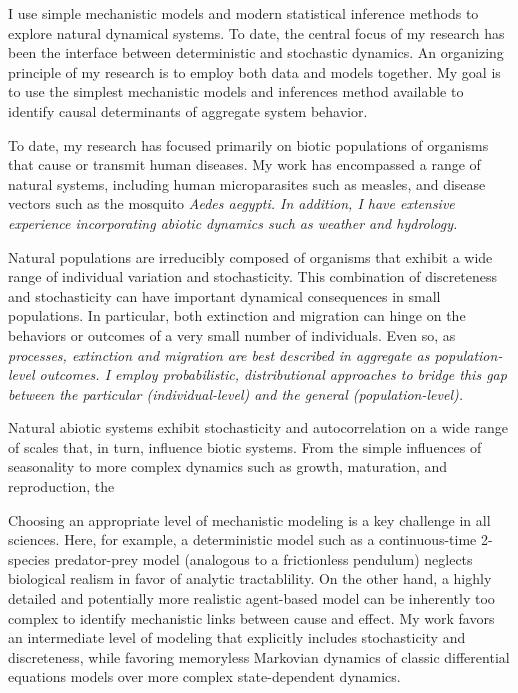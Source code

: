 \documentclass[12pt]{article}
\author{Christian Gunning}
\title{}
\date{\today}
\begin{document}
I use simple mechanistic models and modern statistical inference 
methods to explore natural dynamical systems.
To date, the central focus of my research has been the interface 
between deterministic and stochastic dynamics. 
An organizing principle of my research is to employ both data and models 
together.  
My goal is to use the simplest mechanistic models and inferences 
method available to identify causal determinants of aggregate 
system behavior.

To date, my research has focused primarily on biotic populations
of organisms that cause or transmit human diseases.  My work has 
encompassed a range of natural systems, 
including human microparasites such as measles,
and disease vectors such as the mosquito 
\em{Aedes aegypti}.  In addition, I have extensive 
experience incorporating abiotic dynamics such as weather
and hydrology.

Natural populations are irreducibly composed of 
organisms that exhibit a wide range of individual variation 
and stochasticity.  This combination of discreteness and 
stochasticity can have important dynamical consequences in
small populations. In particular, both extinction and migration
can hinge on the behaviors or outcomes of a very small
number of individuals.
Even so, as \em{processes}, extinction and migration are best
described in aggregate as population-level outcomes. I employ 
probabilistic, distributional approaches to bridge this
gap between the particular (individual-level) and 
the general (population-level).

Natural abiotic systems exhibit stochasticity and 
autocorrelation on a wide range of scales that, in turn,
influence biotic systems. From the simple influences of 
seasonality to more complex dynamics such as growth, 
maturation, and reproduction, the 

Choosing an appropriate level of mechanistic modeling is a key 
challenge in all sciences.  Here, for example, a
deterministic model such as a continuous-time 
2-species predator-prey model (analogous to a frictionless pendulum) 
neglects biological realism in favor of 
analytic tractablility.  On the other hand, a highly detailed 
and potentially more realistic agent-based model
can be inherently too complex to identify mechanistic links 
between cause and effect.  My work favors an intermediate 
level of modeling that explicitly includes stochasticity and 
discreteness, while favoring memoryless Markovian dynamics of 
classic differential equations models over  
more complex state-dependent dynamics.
\end{document}
